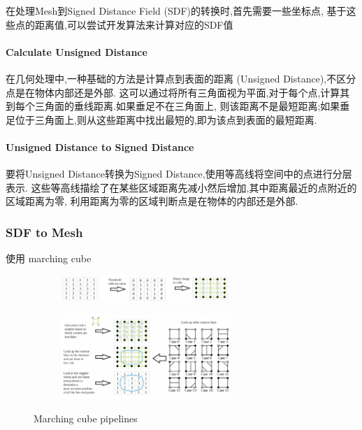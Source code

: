 在处理Mesh到Signed Distance Field (SDF)的转换时,首先需要一些坐标点,
基于这些点的距离值,可以尝试开发算法来计算对应的SDF值

\paragraph{Calculate Unsigned Distance}
在几何处理中,一种基础的方法是计算点到表面的距离 (Unsigned Distance),不区分点是在物体内部还是外部.
这可以通过将所有三角面视为平面,对于每个点,计算其到每个三角面的垂线距离.如果垂足不在三角面上,
则该距离不是最短距离;如果垂足位于三角面上,则从这些距离中找出最短的,即为该点到表面的最短距离.

\paragraph{Unsigned Distance to Signed Distance}
要将Unsigned Distance转换为Signed Distance,使用等高线将空间中的点进行分层表示.
这些等高线描绘了在某些区域距离先减小然后增加,其中距离最近的点附近的区域距离为零,
利用距离为零的区域判断点是在物体的内部还是外部.

\subsubsection{SDF to Mesh}

使用 marching cube

\begin{figure}[H]
    \centering
    \begin{subfigure}
        \centering
        \includegraphics[width=0.7\textwidth]{figures/marching_cube1.png}
    \end{subfigure}
    \vspace{1em} %
    \begin{subfigure}
        \centering
        \includegraphics[width=0.7\textwidth]{figures/marching_cube2.png}
    \end{subfigure}
    \caption{Marching cube pipelines}
    \label{fig:marching_cube}
\end{figure}

